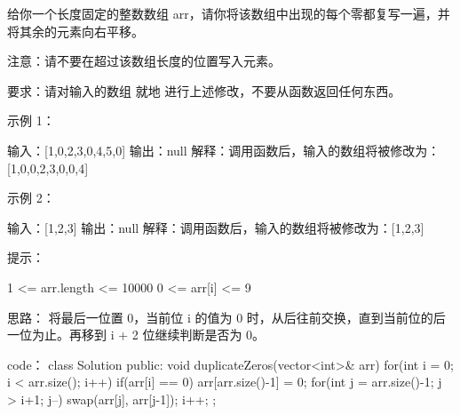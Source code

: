 给你一个长度固定的整数数组 arr，请你将该数组中出现的每个零都复写一遍，并将其余的元素向右平移。

注意：请不要在超过该数组长度的位置写入元素。

要求：请对输入的数组 就地 进行上述修改，不要从函数返回任何东西。

 

示例 1：

输入：[1,0,2,3,0,4,5,0]
输出：null
解释：调用函数后，输入的数组将被修改为：[1,0,0,2,3,0,0,4]

示例 2：

输入：[1,2,3]
输出：null
解释：调用函数后，输入的数组将被修改为：[1,2,3]

 

提示：

    1 <= arr.length <= 10000
    0 <= arr[i] <= 9























思路：
将最后一位置 0，当前位 i 的值为 0 时，从后往前交换，直到当前位的后一位为止。再移到 i + 2 位继续判断是否为 0。
























code：
class Solution {
public:
    void duplicateZeros(vector<int>& arr) {
        for(int i = 0; i < arr.size(); i++)
        {
            if(arr[i] == 0)
            {
                arr[arr.size()-1] = 0;
                for(int j = arr.size()-1; j > i+1; j--)
                {
                    swap(arr[j], arr[j-1]);
                }
                i++;
            }
        }
    }
};